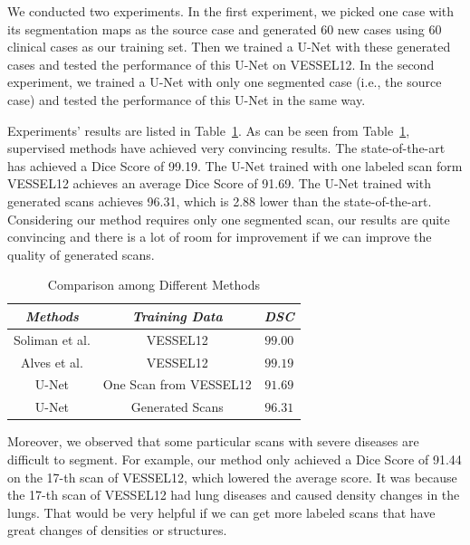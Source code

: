 \documentclass{article}
\begin{document}
We conducted two experiments.
In the first experiment, we picked one case with its segmentation maps as the source case and generated 60 new cases using 60 clinical cases as our training set. Then we trained a U-Net with these generated cases and tested the performance of this U-Net on VESSEL12.
In the second experiment, we trained a U-Net with only one segmented case (i.e., the source case) and tested the performance of this U-Net in the same way. 

Experiments' results are listed in Table~\ref{vesselres}. As can be seen from Table~\ref{vesselres}, supervised methods have achieved very convincing results. The state-of-the-art has achieved a Dice Score of 99.19. The U-Net trained with one labeled scan form VESSEL12 achieves an average Dice Score of 91.69. The U-Net trained with generated scans achieves 96.31, which is 2.88 lower than the state-of-the-art. Considering our method requires only one segmented scan, our results are quite convincing and there is a lot of room for improvement if we can improve the quality of generated scans.

\begin{table}[htbp]
    \vspace{-0.5cm}
    
    \caption{Comparison among Different Methods}
    \begin{center}
    \begin{tabular}{c|c|c}

    \hline
    \textbf{\textit{Methods}} & \textbf{\textit{Training Data}}& \textbf{\textit{DSC}}\\
    \hline
    Soliman et al. \cite{soliman2016accurate} & VESSEL12 & $99.00$ \\
    Alves et al. \cite{alves2018extracting} & VESSEL12 & $99.19$ \\
    \hline
    U-Net & One Scan from VESSEL12 & $91.69$ \\
    U-Net & Generated Scans & $96.31$ \\
    \hline

    \end{tabular}
    \end{center}
    \vspace{-0.3cm}
    \label{vesselres}
    \end{table}

Moreover, we observed that some particular scans with severe diseases are difficult to segment. For example, our method only achieved a Dice Score of 91.44 on the 17-th scan of VESSEL12, which lowered the average score. It was because the 17-th scan of VESSEL12 had lung diseases and caused density changes in the lungs. That would be very helpful if we can get more labeled scans that have great changes of densities or structures.
\end{document}
